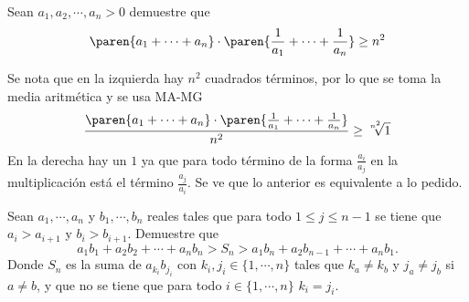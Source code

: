 \documentclass{ayudantia}
\begin{document}
\begin{prob}
    Sean \(a_1,a_2,\cdots,a_n>0\) demuestre que
    \begin{equation*}
        \paren{a_1+\cdots+a_n}\cdot\paren{\frac1{a_1}+\cdots+\frac1{a_n}}\geq n^2
    \end{equation*}
\end{prob}

\begin{ans}
    \begin{sol}
        Se nota que en la izquierda hay \(n^2\) cuadrados términos, por lo que se toma la media aritmética y se usa MA-MG
        \begin{equation*}
            \frac{\paren{a_1+\cdots+a_n}\cdot\paren{\frac1{a_1}+\cdots+\frac1{a_n}}}{n^2}\geq \sqrt[n^2]{1}
        \end{equation*}
        En la derecha hay un \(1\) ya que para todo término de la forma \(\frac{a_i}{a_j}\) en la multiplicación está el término \(\frac{a_j}{a_i}\). Se ve que lo anterior es equivalente a lo pedido.
    \end{sol}
\end{ans}


\begin{prob}
    Sean \(a_1,\cdots,a_n\) y \(b_1,\cdots, b_n\) reales tales que para todo \(1\leq j\leq n-1\) se tiene que \(a_i>a_{i+1}\) y \(b_i>b_{i+1}\). Demuestre que
    \begin{equation*}
        a_1b_1+a_2b_2+\cdots+a_nb_n>S_n>a_1b_n+a_2b_{n-1}+\cdots+a_nb_1.
    \end{equation*}
    Donde \(S_n\) es la suma de \(a_{k_i}b_{j_i}\) con \(k_i,j_i\in\{1,\cdots,n\}\) tales que \(k_a\neq k_b\) y \(j_a\neq j_b\) si \(a\neq b\), y que no se tiene que para todo \(i\in\{1,\cdots,n\}\) \(k_i=j_i\).
\end{prob}
\end{document}
